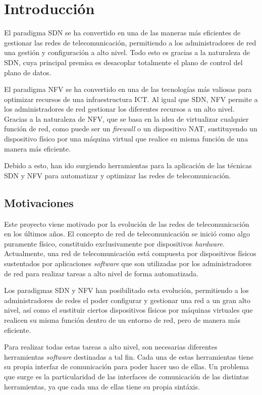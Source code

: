 \chapter{Introducción}

El paradigma \ac{SDN} se ha convertido en una de las maneras más eficientes de gestionar las redes de telecomunicación, permitiendo a los administradores de red una gestión y configuración a alto nivel. Todo esto es gracias a la naturaleza de \ac{SDN}, cuya principal premisa es desacoplar totalmente el plano de control del plano de datos.

El paradigma \ac{NFV} se ha convertido en una de las tecnologías más valiosas para optimizar recursos de una infraestructura \ac{ICT}. Al igual que \ac{SDN}, \ac{NFV} permite a los administradores de red gestionar los diferentes recursos a un alto nivel. Gracias a la naturaleza de NFV, que se basa en la idea de virtualizar cualquier función de red, como puede ser un \textit{firewall} o un dispositivo \ac{NAT}, sustituyendo un dispositivo físico por una máquina virtual que realice su misma función de una manera más eficiente.

Debido a esto, han ido surgiendo herramientas para la aplicación de las técnicas \ac{SDN} y \ac{NFV} para automatizar y optimizar las redes de telecomunicación.

\section{Motivaciones}

Este proyecto viene motivado por la evolución de las redes de telecomunicación en los últimos años. El concepto de red de telecomunicación se inició como algo puramente físico, constituido exclusivamente por dispositivos \textit{hardware}. Actualmente, una red de telecomunicación está compuesta por dispositivos físicos sustentados por aplicaciones \textit{software} que son utilizadas por los administradores de red para realizar tareas a alto nivel de forma automatizada.

Los paradigmas \ac{SDN} y \ac{NFV} han posibilitado esta evolución, permitiendo a los administradores de redes el poder configurar y gestionar una red a un gran alto nivel, así como el sustituir ciertos dispositivos físicos por máquinas virtuales que realicen su misma función dentro de un entorno de red, pero de manera más eficiente.

Para realizar todas estas tareas a alto nivel, son necesarias diferentes herramientas \textit{software} destinadas a tal fin. Cada una de estas herramientas tiene su propia interfaz de comunicación para poder hacer uso de ellas. Un problema que surge es la particularidad de las interfaces de comunicación de las distintas herramientas, ya que cada una de ellas tiene su propia sintáxis.


